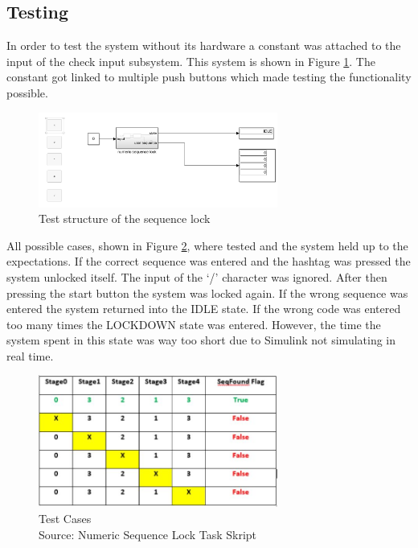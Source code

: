 		\subsection{Testing}
		In order to test the system without its hardware a constant was attached to the input of the check input subsystem. This system is shown in Figure \ref{fig:test}. The constant got linked to multiple push buttons which made testing the functionality possible. 
			\begin{figure}[H]
					\centering
					\includegraphics[width=0.7\textwidth]{figures/testing_sim.png}
					\caption{Test structure of the sequence lock}
					\label{fig:test}
			\end{figure}
		All possible cases, shown in Figure \ref{fig:testcases}, where tested and the system held up to the expectations. If the correct sequence was entered and the hashtag was pressed the system unlocked itself. The input of the ‘/’ character was ignored. After then pressing the start button the system was locked again. If the wrong sequence was entered the system returned into the IDLE state. If the wrong code was entered too many times the LOCKDOWN state was entered. However, the time the system spent in this state was way too short due to Simulink not simulating in real time.
			\begin{figure}[H]
				\centering
				\includegraphics[width=0.7\textwidth]{figures/testcases.jpg}
				\caption[Test Cases]{Test Cases\\ Source: Numeric Sequence Lock Task Skript}
				\label{fig:testcases}
			\end{figure}
		
